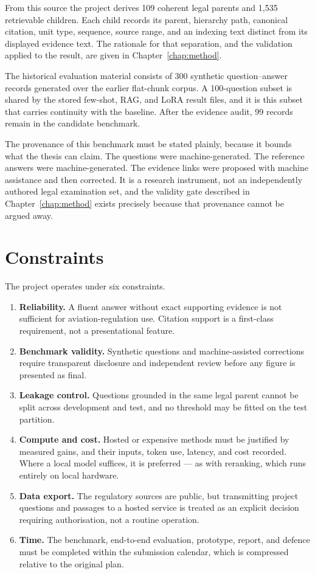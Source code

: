 From this source the project derives 109 coherent legal parents and 1{,}535 retrievable children. Each child records its parent, hierarchy path, canonical citation, unit type, sequence, source range, and an indexing text distinct from its displayed evidence text. The rationale for that separation, and the validation applied to the result, are given in Chapter~\ref{chap:method}.

The historical evaluation material consists of 300 synthetic question--answer records generated over the earlier flat-chunk corpus. A 100-question subset is shared by the stored few-shot, \ac{RAG}, and \ac{LoRA} result files, and it is this subset that carries continuity with the baseline. After the evidence audit, 99 records remain in the candidate benchmark.

The provenance of this benchmark must be stated plainly, because it bounds what the thesis can claim. The questions were machine-generated. The reference answers were machine-generated. The evidence links were proposed with machine assistance and then corrected. It is a research instrument, not an independently authored legal examination set, and the validity gate described in Chapter~\ref{chap:method} exists precisely because that provenance cannot be argued away.

\section{Constraints}
\label{sec:context-constraints}

The project operates under six constraints.

\begin{enumerate}
  \item \textbf{Reliability.} A fluent answer without exact supporting evidence is not sufficient for aviation-regulation use. Citation support is a first-class requirement, not a presentational feature.
  \item \textbf{Benchmark validity.} Synthetic questions and machine-assisted corrections require transparent disclosure and independent review before any figure is presented as final.
  \item \textbf{Leakage control.} Questions grounded in the same legal parent cannot be split across development and test, and no threshold may be fitted on the test partition.
  \item \textbf{Compute and cost.} Hosted or expensive methods must be justified by measured gains, and their inputs, token use, latency, and cost recorded. Where a local model suffices, it is preferred --- as with reranking, which runs entirely on local hardware.
  \item \textbf{Data export.} The regulatory sources are public, but transmitting project questions and passages to a hosted service is treated as an explicit decision requiring authorisation, not a routine operation.
  \item \textbf{Time.} The benchmark, end-to-end evaluation, prototype, report, and defence must be completed within the submission calendar, which is compressed relative to the original plan.
\end{enumerate}


